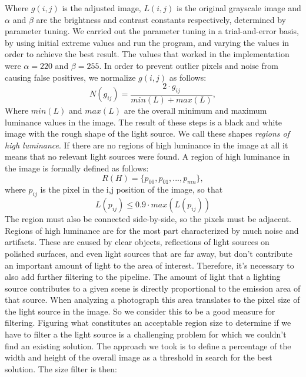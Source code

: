 Where $g(i,j)$ is the adjusted image, $L(i,j)$ is the original grayscale image and $\alpha$ and $\beta$ are the brightness and contrast constants respectively, determined by parameter tuning. We carried out the parameter tuning in a trial-and-error basis, by using initial extreme values and run the program, and varying the values in order to achieve the best result. The values that worked in the implementation were $\alpha = 220$ and $\beta = 255$.
In order to prevent outlier pixels and noise from causing false positives, we normalize $g(i,j)$ as follows:
\begin{equation}
    N(g_{ij}) = \frac{ 2 \cdot g_{ij} }{min(L) + max(L)},
\end{equation}
Where $min(L)$ and $max(L)$ are the overall minimum and maximum luminance values in the image. 
\newline
The result of these steps is a black and white image with the rough shape of the light source. We call these shapes \emph{regions of high luminance}. If there are no regions of high luminance in the image at all it means that no relevant light sources were found. A region of high luminance in the image is formally defined as follows:
\begin{equation}
    R(H) = \{p_{00}, p_{01}, ... , p_{mn}\},
\end{equation}
 where $p_{ij}$ is the pixel in the i,j position of the image, so that 
\[
    L(p_{ij}) \leq 0.9 \cdot max(L(p_{ij})) 
\]
The region must also be connected side-by-side, so the pixels must be adjacent.\newline
Regions of high luminance are for the most part characterized by much noise and artifacts. These are caused by clear objects, reflections of light sources on polished surfaces, and even light sources that are far away, but don't contribute an important amount of light to the area of interest. Therefore, it's necessary to also add further filtering to the pipeline. \newline
The amount of light that a lighting source contributes to a given scene is directly proportional to the emission area of that source. When analyzing a photograph this area translates to the pixel size of the light source in the image. So we consider this to be a good measure for filtering. Figuring what constitutes an acceptable region size to determine if we have to filter a the light source is a challenging problem for which we couldn't find an existing solution. The approach we took is to define a percentage of the width and height of the overall image as a threshold in search for the best solution. The size filter is then:
